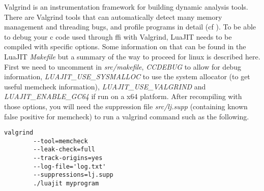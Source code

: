 
Valgrind is an instrumentation framework for building dynamic analysis tools.
There are Valgrind tools that can automatically detect many memory management
and threading bugs, and profile programs in detail (cf \cite{valgrind}). To be
able to debug your c code used through ffi with Valgrind, LuaJIT needs to be
compiled with specific options. Some information on that can be found in the
LuaJIT \emph{Makefile} but a summary of the way to proceed for linux is described
here. First we need to uncomment in \emph{src/makefile}, \emph{CCDEBUG} to
allow for debug information, \emph{LUAJIT\_USE\_SYSMALLOC} to use the system
allocator (to get useful memcheck information), \emph{LUAJIT\_USE\_VALGRIND}
and \emph{LUAJIT\_ENABLE\_GC64} if run on a x64 platform. After recompiling
with those options, you will need the suppression file \emph{src/lj.supp}
(containing known false positive for memcheck) to run a valgrind command such as
the following.

\begin{lstlisting}[style=CStyle]
valgrind
		--tool=memcheck
		--leak-check=full
		--track-origins=yes
		--log-file='log.txt'
		--suppressions=lj.supp
		./luajit myprogram
\end{lstlisting}


